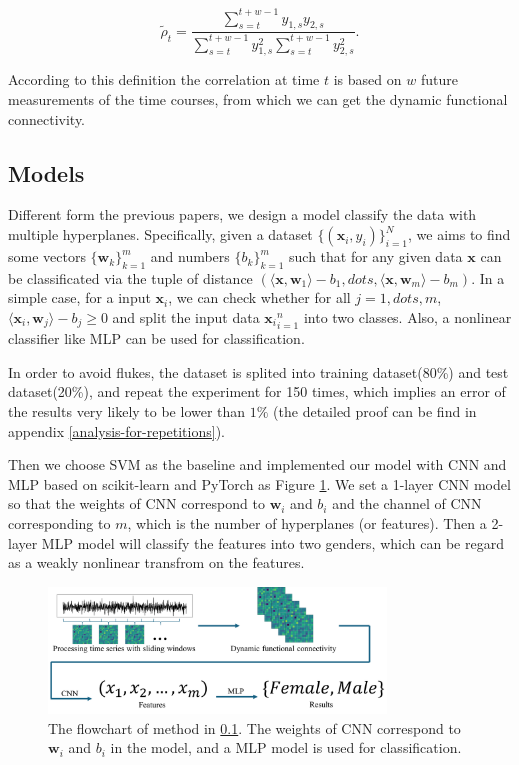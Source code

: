 \documentclass[11pt]{article}
\begin{document}
$$
    \tilde\rho_t = \frac{\sum_{s=t}^{t+w-1} y_{1, s} y_{2, s}}{\sum_{s=t}^{t+w-1} y_{1, s}^2 \sum_{s=t}^{t+w-1} y_{2, s}^2}.
$$

According to this definition the correlation at time $t$ is based on $w$ future measurements of the time courses, from which we can get the dynamic functional connectivity.

\subsection{Models}
\label{sec-Models}

Different form the previous papers, we design a model classify the data with multiple hyperplanes. Specifically, given a dataset $\{(\mathbf{x}_i , y_i)\}_{i=1}^N$, we aims to find some vectors $\{\mathbf{w}_k\}_{k=1}^m$ and numbers $\{b_k\}_{k=1}^m$ such that for any given data $\mathbf{x}$ can be classificated via the tuple of distance $(\langle \mathbf{x}, \mathbf{w}_1 \rangle - b_1, dots, \langle \mathbf{x}, \mathbf{w}_m \rangle - b_m)$. In a simple case, for a input $\mathbf{x}_i$, we can check whether for all $j = 1, dots, m$, $\langle \mathbf{x}_i, \mathbf{w}_j \rangle - b_j \geq 0$ and split the input data ${\mathbf{x}_i}_{i=1}^n$ into two classes. Also, a nonlinear classifier like MLP can be used for classification.

In order to avoid flukes, the dataset is splited into training dataset(80\%) and test dataset(20\%), and repeat the experiment for 150 times, which implies an error of the results very likely to be lower than $1\%$ (the detailed proof can be find in appendix \ref{analysis-for-repetitions}).

Then we choose SVM as the baseline and implemented our model with CNN and MLP based on scikit-learn and PyTorch as Figure \ref{figure-model}. We set a 1-layer CNN model so that the weights of CNN correspond to $\mathbf{w}_i$ and $b_i$ and the channel of CNN corresponding to $m$, which is the number of hyperplanes (or features). Then a 2-layer MLP model will classify the features into two genders, which can be regard as a weakly nonlinear transfrom on the features.

\begin{figure}[H]
    \centering
    \includegraphics[width=0.8\textwidth]{./figure/method.png}
    \caption{The flowchart of method in \ref{sec-Models}. The weights of CNN correspond to $\mathbf{w}_i$ and $b_i$ in the model, and a MLP model is used for classification.}
    \label{figure-model}
\end{figure}
\end{document}
